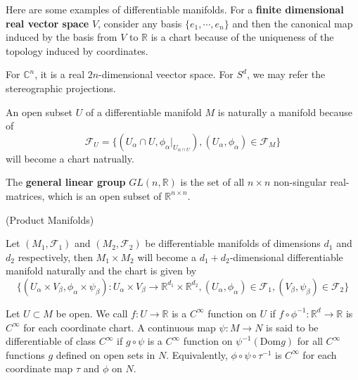 Here are some examples of differentiable manifolds. For a \textbf{finite dimensional real vector space} $V$, consider any basis $\{e_1,\cdots,e_n\}$ and then the canonical map induced by the basis from $V$ to $\mathbb{R}$ is a chart because of the uniqueness of the topology induced by coordinates.\par
For $\mathbb{C}^n$, it is a real $2n$-dimensional veector space. For $S^d$, we may refer the stereographic projections.\par
An open subset $U$ of a differentiable manifold $M$ is naturally a manifold because of
\[\mathcal{F}_U = \{(U_{\alpha}\cap U, \phi_{\alpha}|_{U_{\alpha \cap U}}), (U_{\alpha},\phi_{\alpha}) \in \mathcal{F}_M\}\]
will become a chart natrually.\par
The \textbf{general linear group} $GL(n,\mathbb{R})$ is the set of all $n\times n$ non-singular real-matrices, which is an open subset of $\mathbb{R}^{n\times n}$.\par

\begin{definition}(Product Manifolds)\par
    Let $(M_1,\mathcal{F}_1)$ and $(M_2,\mathcal{F}_2)$ be differentiable manifolds of dimensions $d_1$ and $d_2$ respectively, then $M_1\times M_2$ will become a $d_1+d_2$-dimensional differentiable manifold naturally and the chart is given by
    \[
    \{(U_{\alpha} \times V_{\beta}, \phi_{\alpha} \times \psi_{\beta}):U_{\alpha} \times V_{\beta} \to \mathbb{R}^{d_1}\times\mathbb{R}^{d_2}, (U_{\alpha},\phi_{\alpha})\in \mathcal{F}_1, (V_{\beta},\psi_{\beta})\in \mathcal{F}_2\}
    \] 
\end{definition}

\begin{definition}
    Let $U\subset M$ be open. We call $f:U\to\mathbb{R}$ is a $C^{\infty}$ function on $U$ if $f\circ \phi^{-1}:\mathbb{R}^d \to \mathbb{R}$ is $C^{\infty}$ for each coordinate chart. A continuous map $\psi:M\to N$ is said to be differentiable of class $C^{\infty}$ if $g\circ \psi$ is a $C^{\infty}$ function on $\psi^{-1}(\text{Dom} g)$ for all $C^{\infty}$ functions $g$ defined on open sets in $N$. Equivalently, $\phi\circ \psi \circ \tau^{-1}$ is $C^{\infty}$ for each coordinate map $\tau$ and $\phi$ on $N$.
\end{definition}
